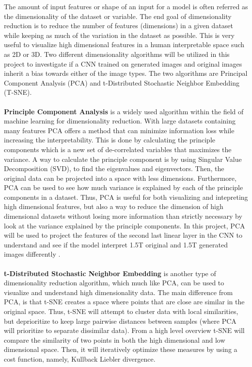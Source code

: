 \documentclass[12pt, fleqn, titlepage]{article}
\newcommand{\1}[1]{\mathds{1}\left[#1\right]}
\begin{document}
The amount of input features or shape of an input for a model is often referred as the dimensionality of the dataset or variable. The end goal of dimensionality reduction is to reduce the number of features (dimensions) in a given dataset while keeping as much of the variation in the dataset as possible. This is very useful to visualize high dimensional features in a human interpretable space such as 2D or 3D. Two different dimensionality algorithms will be utilized in this project to investigate if a CNN trained on generated images and original images inherit a bias towards either of the image types. The two algorithms are Principal Component Analysis (PCA) and t-Distributed Stochastic Neighbor Embedding (T-SNE).
\\\\
\textbf{Principle Component Analysis} is a widely used algorithm within the field of machine learning for dimensionality reduction. With large datasets containing many features PCA offers a method that can minimize information loss while increasing the interpretability. This is done by calculating the principle components which is a new set of de-correlated variables that maximizes the variance. A way to calculate the principle component is by using Singular Value Decomposition (SVD), to find the eigenvalues and eigenvectors. Then, the original data can be projected into a space with less dimensions. Furthermore, PCA can be used to see how much variance is explained by each of the principle components in a dataset. Thus, PCA is useful for both visualizing and intepreting high dimensional features, but also a way to reduce the dimension of high dimensional datasets without losing more information than strictly necessary by look at the variance explained by the principle components. In this project, PCA will be used to project the features of the second last linear layer in the CNN to understand and see if the model interpret 1.5T original and 1.5T generated images differently \cite{pca1} \cite{pca2}. 
\\\\
\textbf{t-Distributed Stochastic Neighbor Embedding} is another type of dimensionality reduction algorithm, which much like PCA, can be used to visualize and understand high dimensionality data. The main difference from PCA, is that t-SNE  creates a space where points that are close are similar in the original space. Thus, t-SNE will attempt to cluster data with local similarities, but deprioritize to keep large pairwise distances between samples (where PCA will prioritize to separate dissimilar data). 
From a high level overview t-SNE will compare the similarity of two points in both the high dimensional and low dimensional space. Then, it will iteratively optimize these measures by using a cost function, namely, Kullback Liebler divergence.
\end{document}

